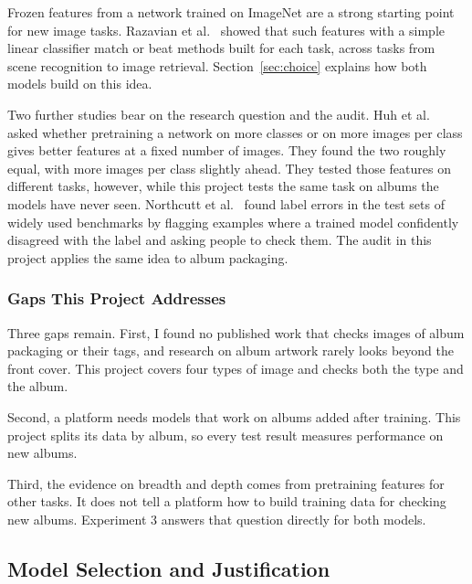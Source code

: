 \documentclass[conference]{IEEEtran}
\begin{document}
Frozen features from a network trained on ImageNet are a strong starting point for new image tasks. Razavian et al.~\cite{razavian2014cnn} showed that such features with a simple linear classifier match or beat methods built for each task, across tasks from scene recognition to image retrieval. Section~\ref{sec:choice} explains how both models build on this idea.

Two further studies bear on the research question and the audit. Huh et al.~\cite{huh2016imagenet} asked whether pretraining a network on more classes or on more images per class gives better features at a fixed number of images. They found the two roughly equal, with more images per class slightly ahead. They tested those features on different tasks, however, while this project tests the same task on albums the models have never seen. Northcutt et al.~\cite{northcutt2021pervasive} found label errors in the test sets of widely used benchmarks by flagging examples where a trained model confidently disagreed with the label and asking people to check them. The audit in this project applies the same idea to album packaging.

\subsubsection{Gaps This Project Addresses}\label{sec:gaps}
Three gaps remain. First, I found no published work that checks images of album packaging or their tags, and research on album artwork rarely looks beyond the front cover. This project covers four types of image and checks both the type and the album.

Second, a platform needs models that work on albums added after training. This project splits its data by album, so every test result measures performance on new albums.

Third, the evidence on breadth and depth comes from pretraining features for other tasks. It does not tell a platform how to build training data for checking new albums. Experiment 3 answers that question directly for both models.

\subsection{Model Selection and Justification}\label{sec:models}
\end{document}
